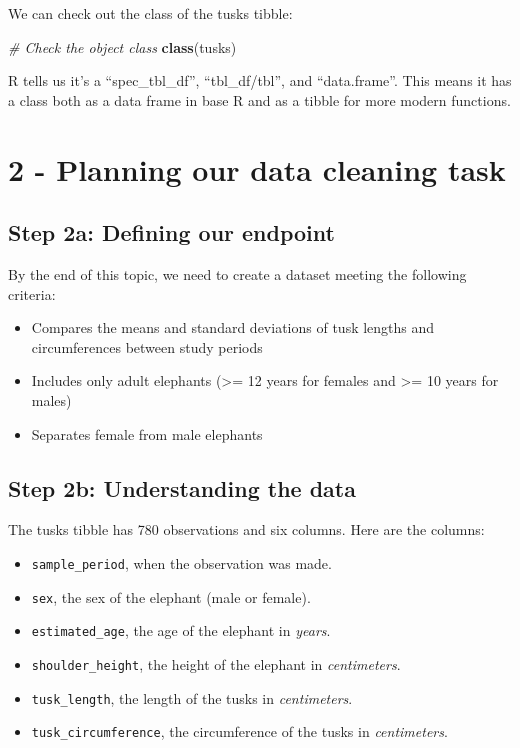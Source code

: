\documentclass[
]{article}
\newenvironment{Shaded}{\begin{snugshade}}{\end{snugshade}}
\newcommand{\CommentTok}[1]{\textcolor[rgb]{0.56,0.35,0.01}{\textit{#1}}}
\newcommand{\FunctionTok}[1]{\textcolor[rgb]{0.13,0.29,0.53}{\textbf{#1}}}
\newcommand{\NormalTok}[1]{#1}
\providecommand{\tightlist}{%
  \setlength{\itemsep}{0pt}\setlength{\parskip}{0pt}}
\begin{document}
We can check out the class of the tusks tibble:

\begin{Shaded}
\begin{Highlighting}[]
\CommentTok{\# Check the object class}
\FunctionTok{class}\NormalTok{(tusks)}
\end{Highlighting}
\end{Shaded}

R tells us it's a ``spec\_tbl\_df'', ``tbl\_df/tbl'', and
``data.frame''. This means it has a class both as a data frame in base R
and as a tibble for more modern functions.

\section{2 - Planning our data cleaning
task}\label{planning-our-data-cleaning-task}

\subsection{Step 2a: Defining our
endpoint}\label{step-2a-defining-our-endpoint}

By the end of this topic, we need to create a dataset meeting the
following criteria:

\begin{itemize}
\tightlist
\item
  Compares the means and standard deviations of tusk lengths and
  circumferences between study periods
\item
  Includes only adult elephants (\textgreater= 12 years for females and
  \textgreater= 10 years for males)
\item
  Separates female from male elephants
\end{itemize}

\subsection{Step 2b: Understanding the
data}\label{step-2b-understanding-the-data}

The tusks tibble has 780 observations and six columns. Here are the
columns:

\begin{itemize}
\tightlist
\item
  \texttt{sample\_period}, when the observation was made.
\item
  \texttt{sex}, the sex of the elephant (male or female).
\item
  \texttt{estimated\_age}, the age of the elephant in \emph{years}.
\item
  \texttt{shoulder\_height}, the height of the elephant in
  \emph{centimeters}.
\item
  \texttt{tusk\_length}, the length of the tusks in \emph{centimeters}.
\item
  \texttt{tusk\_circumference}, the circumference of the tusks in
  \emph{centimeters}.
\end{itemize}
\end{document}
